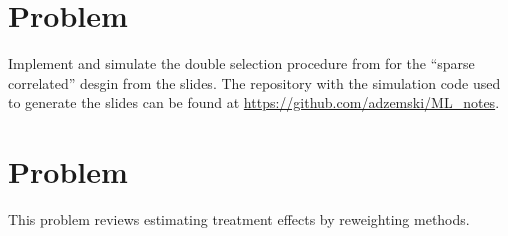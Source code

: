 \documentclass[a4paper]{scrartcl}
\begin{document}
\section*{Problem~}

Implement and simulate the double selection procedure from \textcite{belloni2014inference} for the ``sparse correlated'' desgin from the slides. The repository with the simulation code used to generate the slides can be found at \url{https://github.com/adzemski/ML_notes}.

\section*{Problem~}

This problem reviews estimating treatment effects by reweighting methods. 
\end{document}
